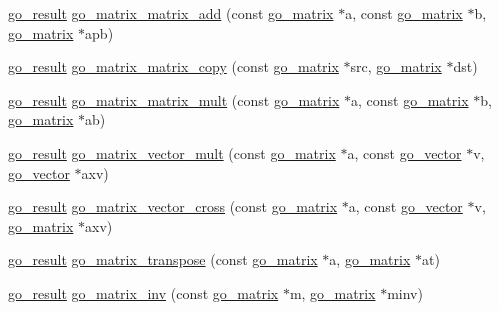 \begin{DoxyCompactItemize}
\item 
\hyperlink{gotypes_8h_a55d48b38cd959f63c7e8db8337a9792a}{go\-\_\-result} \hyperlink{namespacegomotion_af1d2ab626e727673e3a170e236b27f27}{go\-\_\-matrix\-\_\-matrix\-\_\-add} (const \hyperlink{structgomotion_1_1go__matrix}{go\-\_\-matrix} $\ast$a, const \hyperlink{structgomotion_1_1go__matrix}{go\-\_\-matrix} $\ast$b, \hyperlink{structgomotion_1_1go__matrix}{go\-\_\-matrix} $\ast$apb)
\item 
\hyperlink{gotypes_8h_a55d48b38cd959f63c7e8db8337a9792a}{go\-\_\-result} \hyperlink{namespacegomotion_a3812b238fd3884974d1c02c34772d256}{go\-\_\-matrix\-\_\-matrix\-\_\-copy} (const \hyperlink{structgomotion_1_1go__matrix}{go\-\_\-matrix} $\ast$src, \hyperlink{structgomotion_1_1go__matrix}{go\-\_\-matrix} $\ast$dst)
\item 
\hyperlink{gotypes_8h_a55d48b38cd959f63c7e8db8337a9792a}{go\-\_\-result} \hyperlink{namespacegomotion_a6183caffbd0d82718f15155b31656f0e}{go\-\_\-matrix\-\_\-matrix\-\_\-mult} (const \hyperlink{structgomotion_1_1go__matrix}{go\-\_\-matrix} $\ast$a, const \hyperlink{structgomotion_1_1go__matrix}{go\-\_\-matrix} $\ast$b, \hyperlink{structgomotion_1_1go__matrix}{go\-\_\-matrix} $\ast$ab)
\item 
\hyperlink{gotypes_8h_a55d48b38cd959f63c7e8db8337a9792a}{go\-\_\-result} \hyperlink{namespacegomotion_aadef0b21be67d00a35d979661ca05b71}{go\-\_\-matrix\-\_\-vector\-\_\-mult} (const \hyperlink{structgomotion_1_1go__matrix}{go\-\_\-matrix} $\ast$a, const \hyperlink{namespacegomotion_a5739eac588a6a458ed9258bae0a3fc80}{go\-\_\-vector} $\ast$v, \hyperlink{namespacegomotion_a5739eac588a6a458ed9258bae0a3fc80}{go\-\_\-vector} $\ast$axv)
\item 
\hyperlink{gotypes_8h_a55d48b38cd959f63c7e8db8337a9792a}{go\-\_\-result} \hyperlink{namespacegomotion_af513072af00a07811c442f8a98e93a9c}{go\-\_\-matrix\-\_\-vector\-\_\-cross} (const \hyperlink{structgomotion_1_1go__matrix}{go\-\_\-matrix} $\ast$a, const \hyperlink{namespacegomotion_a5739eac588a6a458ed9258bae0a3fc80}{go\-\_\-vector} $\ast$v, \hyperlink{structgomotion_1_1go__matrix}{go\-\_\-matrix} $\ast$axv)
\item 
\hyperlink{gotypes_8h_a55d48b38cd959f63c7e8db8337a9792a}{go\-\_\-result} \hyperlink{namespacegomotion_a249bea0e6ffc14a6274681b595ad738d}{go\-\_\-matrix\-\_\-transpose} (const \hyperlink{structgomotion_1_1go__matrix}{go\-\_\-matrix} $\ast$a, \hyperlink{structgomotion_1_1go__matrix}{go\-\_\-matrix} $\ast$at)
\item 
\hyperlink{gotypes_8h_a55d48b38cd959f63c7e8db8337a9792a}{go\-\_\-result} \hyperlink{namespacegomotion_a3e08f14b7f0ace90e71f7526e35a7463}{go\-\_\-matrix\-\_\-inv} (const \hyperlink{structgomotion_1_1go__matrix}{go\-\_\-matrix} $\ast$m, \hyperlink{structgomotion_1_1go__matrix}{go\-\_\-matrix} $\ast$minv)

\end{DoxyCompactItemize}
